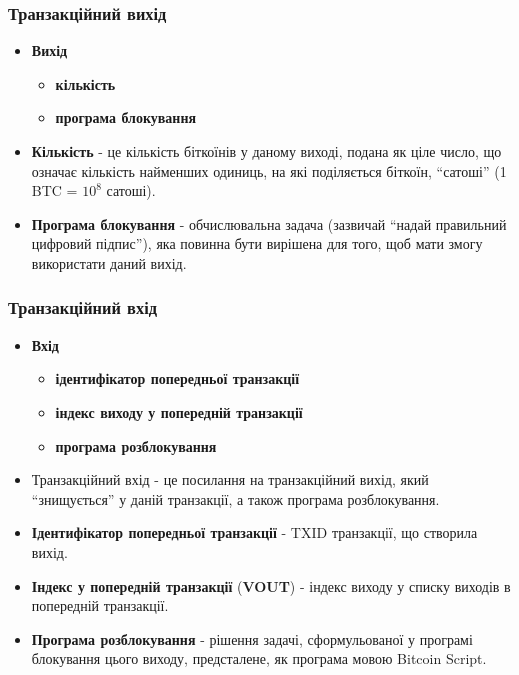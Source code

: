 \documentclass{beamer}
\begin{document}
\begin{frame}
  \frametitle{Транзакційний вихід}
  \begin{itemize}
  \item \textbf{Вихід}
    \begin{itemize}
    \item \textbf{кількість}
    \item \textbf{програма блокування}
    \end{itemize}
  \item \textbf{Кількість} - це кількість біткоїнів у даному виході, подана як
    ціле число, що означає кількість найменших одиниць, на які поділяється
    біткоїн, ``сатоші'' (1 BTC = $10^8$ сатоші).
  \item \textbf{Програма блокування} - обчислювальна задача (зазвичай ``надай
    правильний цифровий підпис''), яка повинна бути вирішена для того, щоб мати
    змогу використати даний вихід.
  \end{itemize}
\end{frame}

\begin{frame}
  \frametitle{Транзакційний вхід}
  \begin{itemize}
  \item \textbf{Вхід}
    \begin{itemize}
    \item \textbf{ідентифікатор попередньої транзакції}
    \item \textbf{індекс виходу у попередній транзакції}
    \item \textbf{програма розблокування}
    \end{itemize}
  \item Транзакційний вхід - це посилання на транзакційний вихід, який
    ``знищується'' у даній транзакції, а також програма розблокування.
  \item \textbf{Ідентифікатор попередньої транзакції} - TXID транзакції, що
    створила вихід.
  \item \textbf{Індекс у попередній транзакції} (\textbf{VOUT}) - індекс виходу
    у списку виходів в попередній транзакції.
  \item \textbf{Програма розблокування} - рішення задачі, сформульованої у
    програмі блокування цього виходу, предсталене, як програма мовою Bitcoin
    Script.
  \end{itemize}
\end{frame}
\end{document}

